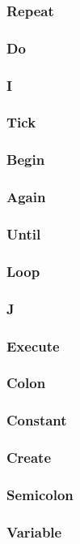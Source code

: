 \subsubsection{Repeat}
\subsubsection{Do}
\subsubsection{I}
\subsubsection{Tick}
\subsubsection{Begin}
\subsubsection{Again}
\subsubsection{Until}
\subsubsection{Loop}
\subsubsection{J}

\subsubsection{Execute}
\subsubsection{Colon}
\subsubsection{Constant}
\subsubsection{Create}
\subsubsection{Semicolon}
\subsubsection{Variable}
